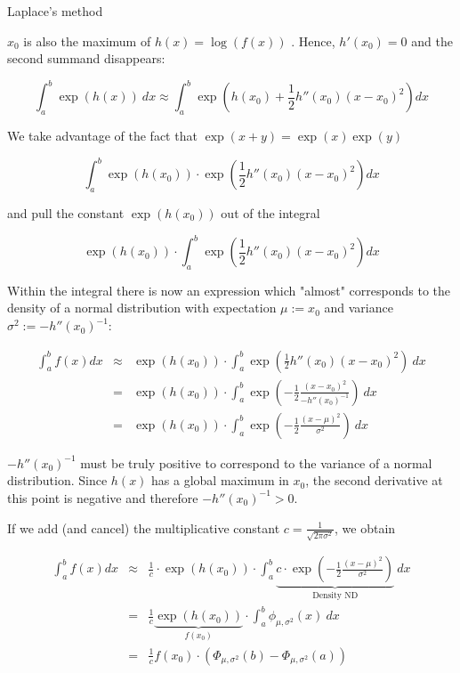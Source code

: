 \documentclass[11pt,compress,t,notes=noshow, xcolor=table]{beamer}
\begin{document}
\begin{vbframe}{Laplace's method}
\framebreak

$x_0$ is also the maximum of $h(x) = \log(f(x))$ . Hence, $h'(x_0) = 0$ and the second summand disappears:

$$
\int_a^b \exp\left(h(x)\right)~dx \approx \int_a^b \exp\left( h(x_0) + \frac{1}{2} h''(x_0)(x - x_0)^2\right) dx
$$

We take advantage of the fact that $\exp(x + y) = \exp(x)\exp(y)$

$$
\int_a^b \exp\left( h(x_0)\right) \cdot \exp\left(\frac{1}{2} h''(x_0)(x - x_0)^2\right) dx
$$

and pull the constant $\exp\left( h(x_0)\right)$ out of the integral

$$
\exp\left( h(x_0)\right) \cdot\int_a^b \exp\left(\frac{1}{2} h''(x_0)(x - x_0)^2\right) dx
$$

\framebreak

Within the integral there is now an expression which "almost" corresponds to the density of a normal distribution with expectation $\mu := x_0$ and variance $\sigma^2 := -h''(x_0)^{-1}$:

\vspace{-0.3cm}

\begin{eqnarray*}
\int_a^b f(x) dx &\approx& \exp\left( h(x_0)\right) \cdot\int_a^b  \exp\left(\frac{1}{2} h''(x_0)(x - x_0)^2\right)~dx \\
&=& \exp\left( h(x_0)\right) \cdot\int_a^b  \exp\left(-\frac{1}{2} \frac{(x - x_0)^2}{-h''(x_0)^{-1}}\right) ~dx\\
&=& \exp\left( h(x_0)\right) \cdot\int_a^b  \exp\left(-\frac{1}{2} \frac{(x - \mu)^2}{\sigma^2}\right)~dx
\end{eqnarray*}

\vfill

\begin{footnotesize}
$-h''(x_0)^{-1}$ must be truly positive to correspond to the variance of a normal distribution. Since $h(x)$ has a global maximum in $x_0$, the second derivative at this point is negative and therefore $-h''(x_0)^{-1} > 0$.
\end{footnotesize}

\framebreak

If we add (and cancel) the multiplicative constant $c = \frac{1}{\sqrt{2\pi\sigma^2}}$, we obtain

\begin{eqnarray*}
\int_a^b f(x) dx &\approx& \frac{1}{c} \cdot \exp\left( h(x_0)\right) \cdot\int_a^b \underbrace{c \cdot \exp\left(-\frac{1}{2} \frac{(x - \mu)^2}{\sigma^2}\right)}_{\text{Density ND}}~dx\\
&=& \frac{1}{c}\underbrace{\exp\left( h(x_0)\right)}_{f(x_0)} \cdot \int_a^b \phi_{\mu, \sigma^2} (x)~dx \\
&=& \frac{1}{c}f(x_0) \cdot \left(\Phi_{\mu, \sigma^2}(b) - \Phi_{\mu, \sigma^2}(a)\right)
\end{eqnarray*}


\end{vbframe}
\end{document}
